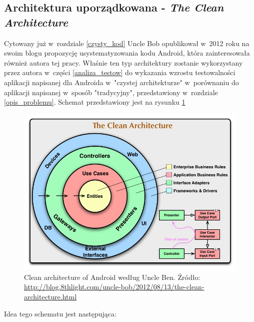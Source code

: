 \subsection{Architektura uporządkowana - \textit{The Clean Architecture}}
\label{clean_architecture_opis}
Cytowany już w~rozdziale \ref{czysty_kod} Uncle Bob opublikował w~2012 roku na swoim blogu propozycję usystematyzowania kodu Android, która zainteresowała również autora tej pracy. Właśnie ten typ architektury zostanie wykorzystany przez autora w~części \ref{analiza_testow} do wykazania wzrostu testowalności aplikacji napisanej dla Androida w~"czystej architekturze" w~porównaniu do aplikacji napisanej w~sposób "tradycyjny", przedstawiony w~rozdziale \ref{opis_problemu}. Schemat przedstawiony jest na rysunku \ref{fig:clean_architecture}

\begin{figure}[!htb]
    \centering
    \includegraphics[width=13cm]{imgs/ch4_clean_architecture.jpg}
    \caption
{Clean architecture of Android według Uncle Ben. Źródło: \url{http://blog.8thlight.com/uncle-bob/2012/08/13/the-clean-architecture.html}}
    \label{fig:clean_architecture}
\end{figure} 

Idea tego schematu jest następująca:

